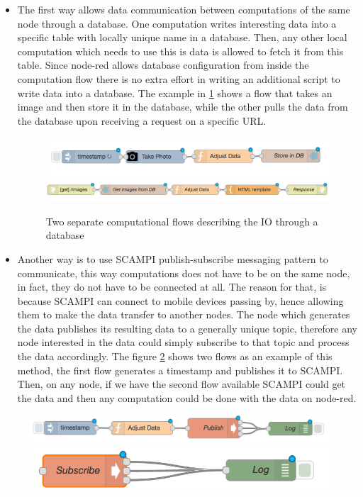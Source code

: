 \begin{itemize}
\item The first way allows data communication between computations of the same node through a database. One computation  writes interesting data into a specific table with locally unique name in a database. Then, any other local computation which needs to use this is data is allowed to fetch it from this table. Since node-red allows database configuration from inside the computation flow there is no extra effort in writing an additional script to write data into a database. The example in \ref{fig:db} shows a flow that takes an image and then store it in the database, while the other pulls the data from the database upon receiving a request on a specific URL. 

\begin{figure}[H]
	\centering
	\includegraphics[scale=0.5]{images/db-out.png}
	\includegraphics[scale=0.5]{images/db-in.png}
	\caption{Two separate computational flows describing the IO through a database }
	\label{fig:db}
\end{figure}

\item Another way is to use SCAMPI publish-subscribe messaging pattern to communicate, this way computations  does not have to be on the same node, in fact, they do not have to be connected at all. The reason for that, is because SCAMPI can connect to mobile devices passing by, hence allowing them to make the data transfer  to another nodes. The node which generates the data publishes its resulting data to a generally unique topic, therefore any node interested in the data could simply subscribe to that topic and process the data accordingly. The figure \ref{fig:scampi} shows two flows as an example of this method, the first flow generates a timestamp and publishes it to SCAMPI. Then, on any node, if we have the second flow available SCAMPI could get the data and then any computation could be done with the data on node-red. 
\end{itemize}	


\begin{figure}[H]
	\centering
	\includegraphics[scale=0.6]{images/SCAMPI-pub.png}
	\includegraphics[scale=0.6]{images/SCAMPI-sub.png}
	\caption{ }
	\label{fig:scampi}
\end{figure}

